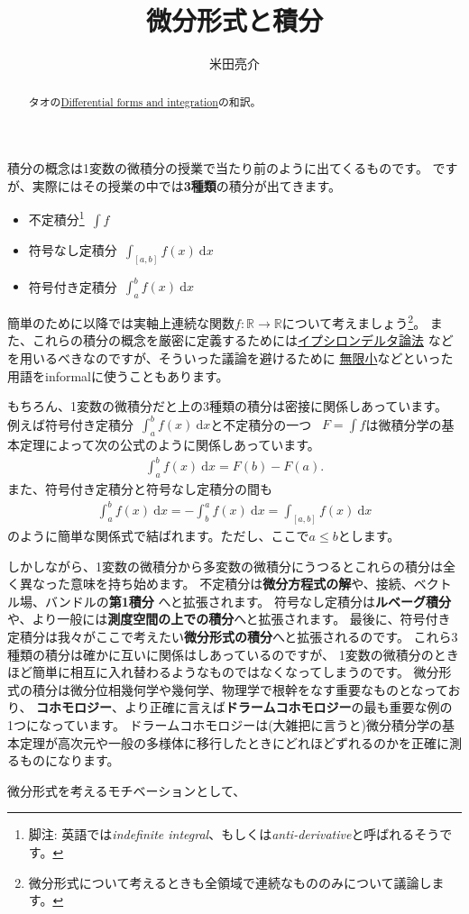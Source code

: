 \documentclass{jsarticle}
\def\diff{\textrm{d}}
\begin{document}
\title{微分形式と積分}
\author{米田亮介}
\maketitle
\begin{abstract}
タオの\href{https://www.math.ucla.edu/~tao/preprints/forms.pdf}{Differential forms and integration}の和訳。
\end{abstract}

積分の概念は1変数の微積分の授業で当たり前のように出てくるものです。
ですが、実際にはその授業の中では\textbf{3種類}の積分が出てきます。
\begin{itemize}
    \item 不定積分\footnote{脚注: 英語では\textit{indefinite integral}、もしくは\textit{anti-derivative}と呼ばれるそうです。}~$\int f$
    \item 符号なし定積分~$\int_{[a,b]}f(x)~\diff x$
    \item 符号付き定積分~$\int_{a}^{b}f(x)~\diff x$
\end{itemize}
簡単のために以降では実軸上連続な関数$f:\mathbb{R}\to\mathbb{R}$について考えましょう\footnote{微分形式について考えるときも全領域で連続なもののみについて議論します。}。
また、これらの積分の概念を厳密に定義するためには\underline{イプシロンデルタ論法}
などを用いるべきなのですが、そういった議論を避けるために
\underline{無限小}などといった用語をinformalに使うこともあります。

もちろん、1変数の微積分だと上の3種類の積分は密接に関係しあっています。
例えば符号付き定積分~$\int_{a}^{b}f(x)~\diff x$と不定積分の一つ~
$F=\int f$は微積分学の基本定理によって次の公式のように関係しあっています。
\begin{align}
\int_{a}^{b}f(x)~\diff x=F(b)-F(a).
\end{align}
また、符号付き定積分と符号なし定積分の間も
\begin{align}
\int_{a}^{b}f(x)~\diff x=-\int_{b}^{a}f(x)~\diff x=\int_{[a,b]}f(x)~\diff x
\end{align}
のように簡単な関係式で結ばれます。ただし、ここで$a\leq b$とします。

しかしながら、1変数の微積分から多変数の微積分にうつるとこれらの積分は全く異なった意味を持ち始めます。
不定積分は\textbf{微分方程式の解}や、接続、ベクトル場、バンドルの\textbf{第1積分}
へと拡張されます。
符号なし定積分は\textbf{ルベーグ積分}や、より一般には\textbf{測度空間の上での積分}へと拡張されます。
最後に、符号付き定積分は我々がここで考えたい\textbf{微分形式の積分}へと拡張されるのです。
これら3種類の積分は確かに互いに関係はしあっているのですが、
1変数の微積分のときほど簡単に相互に入れ替わるようなものではなくなってしまうのです。
微分形式の積分は微分位相幾何学や幾何学、物理学で根幹をなす重要なものとなっており、
\textbf{コホモロジー}、より正確に言えば\textbf{ドラームコホモロジー}の最も重要な例の
1つになっています。
ドラームコホモロジーは(大雑把に言うと)微分積分学の基本定理が高次元や一般の多様体に移行したときにどれほどずれるのかを正確に測るものになります。

微分形式を考えるモチベーションとして、
\end{document}
